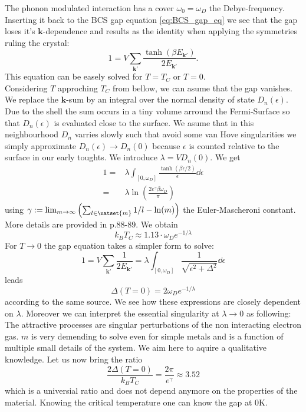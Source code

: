 \documentclass[../main.tex]{subfile}
\begin{document}
The phonon modulated interaction has a cover $\omega_0 = \omega_D$ the Debye-frequency. Inserting it back to the BCS gap equation 
\ref{eq:BCS_gap_eq} we see that the gap loses it's $\bm{k}$-dependence and results as the identity when applying the symmetries
ruling the crystal:
\begin{equation*}
    1 = V\sum_{\bm{k}'} \frac{\tanh\left(\beta E_{\bm{k}'}\right)}{2 E_{\bm{k}'}}.
\end{equation*}
This equation can be easely solved for $T=T_C$ or $T = 0$.\\

Considering $T$ approching $T_C$ from bellow, we can asume that the gap vanishes. We replace the $\bm{k}$-sum by an integral over the normal 
density of state $D_n(\epsilon)$. Due to the shell the sum occurs in a tiny volume arround the Fermi-Surface so that $D_n(\epsilon)$ is 
evaluated close to the surface. We asume that in this neighbourhood $D_n$ varries slowly such that avoid some van Hove singularities we 
simply approximate $D_n(\epsilon) \rightarrow D_n(0)$ because $\epsilon$ is counted relative to the surface in our early toughts. 
We introduce $\lambda = V D_n(0)$. We get 
\begin{equation*}
    \begin{aligned}
        1 =& \lambda \int_{[0,\omega_D]} \frac{\tanh\left(\beta\epsilon/2\right)}{\epsilon} \dd \epsilon\\
        =& \lambda \ln\left(\frac{2e^{\gamma}\beta \omega_D}{\pi}\right)
    \end{aligned}
\end{equation*}
using $\gamma := \lim_{m \to\infty} \left(\sum_{l\in\natset{m}} 1/l - \ln(m)\right)$ the Euler-Mascheroni constant. More details are provided
in \cite{FossheimSudbo2004} p.88-89. We obtain
\[
    k_B T_C \approx 1.13\cdot  \omega_D e^{-1/\lambda}
\]
For $T\rightarrow 0$ the gap equation takes a simpler form to solve:
\begin{equation*}
        1 = V \sum_{\bm{k}'} \frac{1}{2 E_{\bm{k}'}} = \lambda\int_{[0,\omega_D]}  \frac{1}{\sqrt{\epsilon^2 + \Delta^2}}\dd \epsilon
\end{equation*}
leads 
\[
    \Delta(T=0) = 2 \omega_D e^{-1/\lambda}
\]
according to the same source. We see how these expressions are closely dependent on $\lambda$. Moreover we can interpret the essential singularity
at $\lambda\rightarrow 0$ as following: The attractive processes are singular perturbations of the non interacting electron gas.
$m$ is very demending to solve even for simple metals and is a function of multiple small details of the system. We aim here 
to aquire a qualitative knowledge. Let us now bring the ratio
\[
    \frac{2\Delta(T=0)}{k_B T_C} = \frac{2 \pi}{e^{\gamma}} \approx 3.52
\]  
which is a universial ratio and does not depend anymore on the properties of the material. Knowing the critical temperature one can know
the gap at $0\si{\kelvin}$.
\end{document}
